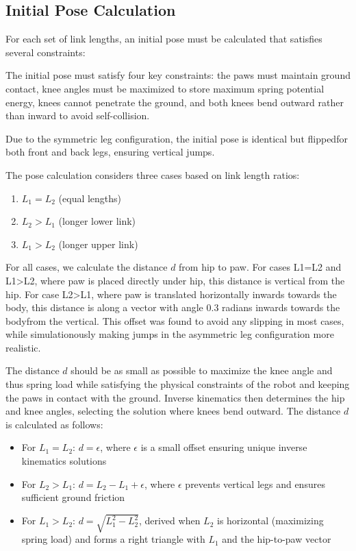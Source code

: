 \subsection{Initial Pose Calculation}
For each set of link lengths, an initial pose must be calculated that satisfies several constraints:

The initial pose must satisfy four key constraints: the paws must maintain ground contact, knee angles must be maximized to store maximum spring potential energy, knees cannot penetrate the ground, and both knees bend outward rather than inward to avoid self-collision.

Due to the symmetric leg configuration, the initial pose is identical but flippedfor both front and back legs, ensuring vertical jumps.

The pose calculation considers three cases based on link length ratios:

\begin{enumerate}
    \item \(L_1 = L_2\) (equal lengths)
    \item \(L_2 > L_1\) (longer lower link)
    \item \(L_1 > L_2\) (longer upper link)
\end{enumerate}

For all cases, we calculate the distance \(d\) from hip to paw. For cases L1=L2 and L1>L2, where paw is placed directly under hip, this distance is vertical from the hip. For case L2>L1, where paw is translated horizontally inwards towards the body, this distance is along a vector with angle 0.3 radians inwards towards the bodyfrom the vertical. This offset was found to avoid any slipping in most cases, while simulationously making jumps in the asymmetric leg configuration more realistic. 

The distance \(d\) should be as small as possible to maximize the knee angle and thus spring load while satisfying the physical constraints of the robot and keeping the paws in contact with the ground. Inverse kinematics then determines the hip and knee angles, selecting the solution where knees bend outward. The distance \(d\) is calculated as follows:

\begin{itemize}
    \item For \(L_1 = L_2\): \(d = \epsilon\), where \(\epsilon\) is a small offset ensuring unique inverse kinematics solutions
    \item For \(L_2 > L_1\): \(d = L_2 - L_1 + \epsilon\), where \(\epsilon\) prevents vertical legs and ensures sufficient ground friction
    \item For \(L_1 > L_2\): \(d = \sqrt{L_1^2 - L_2^2}\), derived when \(L_2\) is horizontal (maximizing spring load) and forms a right triangle with \(L_1\) and the hip-to-paw vector
\end{itemize}

